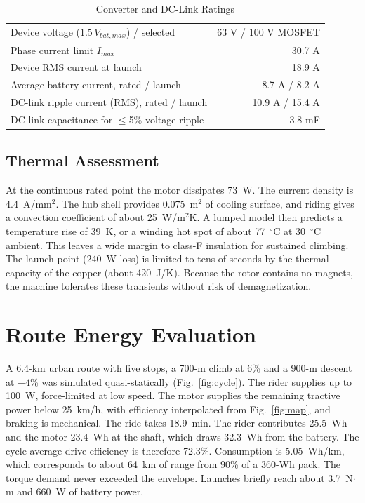 \documentclass[journal]{IEEEtran}
\begin{document}
\begin{table}[!t]
\caption{Converter and DC-Link Ratings}
\label{tab:conv}
\centering
\renewcommand{\arraystretch}{1.1}
\begin{tabular}{l r}
\hline
Device voltage ($1.5\,V_{bat,max}$) / selected & 63 V / 100 V MOSFET\\
Phase current limit $I_{max}$ & 30.7 A\\
Device RMS current at launch & 18.9 A\\
Average battery current, rated / launch & 8.7 A / 8.2 A\\
DC-link ripple current (RMS), rated / launch & 10.9 A / 15.4 A\\
DC-link capacitance for $\le$5\% voltage ripple & 3.8 mF\\
\hline
\end{tabular}
\end{table}

\subsection{Thermal Assessment}
At the continuous rated point the motor dissipates 73~W. The current density is
4.4~A/mm$^2$. The hub shell provides 0.075~m$^2$ of cooling surface, and riding
gives a convection coefficient of about 25~W/m$^2$K. A lumped model then
predicts a temperature rise of 39~K, or a winding hot spot of about
77~$^\circ$C at 30~$^\circ$C ambient. This leaves a wide margin to class-F
insulation for sustained climbing. The launch point (240~W loss) is limited
to tens of seconds by the thermal capacity of the copper (about 420~J/K).
Because the rotor contains no magnets, the machine tolerates these transients
without risk of demagnetization.

\section{Route Energy Evaluation}
\label{sec:route}
A 6.4-km urban route with five stops, a 700-m climb at 6\% and a 900-m descent at
$-4$\% was simulated quasi-statically (Fig.~\ref{fig:cycle}). The rider supplies
up to 100~W, force-limited at low speed. The motor supplies the remaining
tractive power below 25~km/h, with efficiency interpolated from
Fig.~\ref{fig:map}, and braking is mechanical. The ride takes 18.9~min. The rider
contributes 25.5~Wh and the motor 23.4~Wh at the shaft, which draws 32.3~Wh from
the battery. The cycle-average drive efficiency is therefore 72.3\%. Consumption is
5.05~Wh/km, which corresponds to about 64~km of range from 90\% of a 360-Wh pack.
The torque demand never exceeded the envelope. Launches briefly reach about
3.7~N$\cdot$m and 660~W of battery power.
\end{document}
